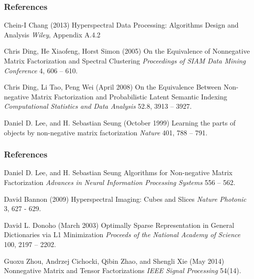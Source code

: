 \documentclass{beamer}
\begin{document}
\begin{frame}
\frametitle{References}
\footnotesize{
\begin{thebibliography}{99}

 Chein-I Chang (2013)
\newblock Hyperspectral Data Processing: Algorithms Design and Analysis
\newblock \emph{Wiley}, Appendix A.4.2

 Chris Ding, He Xiaofeng, Horst Simon (2005)
\newblock On the Equivalence of Nonnegative Matrix Factorization and Spectral Clustering
\newblock \emph{Proceedings of SIAM Data Mining Conference} 4, 606 -- 610.

 Chris Ding, Li Tao, Peng Wei (April 2008)
\newblock On the Equivalence Between Non-negative Matrix Factorization and Probabilistic Latent Semantic Indexing
\newblock \emph{Computational Statistics and Data Analysis} 52.8, 3913 -- 3927.

 Daniel D. Lee, and H. Sebastian Seung (October 1999)
\newblock Learning the parts of objects by non-negative matrix factorization
\newblock \emph{Nature} 401, 788 -- 791.

\end{thebibliography}
}
\end{frame}

\begin{frame}
\frametitle{References}
\footnotesize{
\begin{thebibliography}{99}

 Daniel D. Lee, and H. Sebastian Seung
\newblock Algorithms for Non-negative Matrix Factorization
\newblock \emph{Advances in Neural Information Processing Systems} 556 -- 562.

 David Bannon (2009)
\newblock Hyperspectral Imaging: Cubes and Slices
\newblock \emph{Nature Photonic} 3, 627 - 629.

 David L. Donoho (March 2003)
\newblock Optimally Sparse Representation in General Dictionaries via L1 Minimization
\newblock \emph{Proceeds of the National Academy of Science} 100, 2197 -- 2202.

 Guoxu Zhou, Andrzej Cichocki, Qibin Zhao, and Shengli Xie (May 2014)
\newblock Nonnegative Matrix and Tensor Factorizations
\newblock \emph{IEEE Signal Processing} 54(14).


\end{thebibliography}
}
\end{frame}
\end{document}
